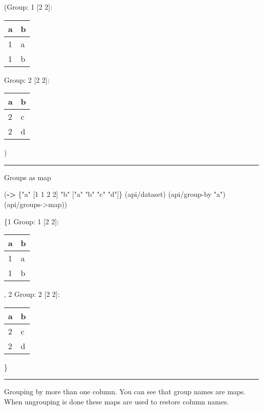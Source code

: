 \documentclass[]{article}
\newenvironment{Shaded}{\begin{snugshade}}{\end{snugshade}}
\newcommand{\KeywordTok}[1]{\textcolor[rgb]{0.13,0.29,0.53}{\textbf{#1}}}
\newcommand{\DecValTok}[1]{\textcolor[rgb]{0.00,0.00,0.81}{#1}}
\newcommand{\StringTok}[1]{\textcolor[rgb]{0.31,0.60,0.02}{#1}}
\newcommand{\NormalTok}[1]{#1}
\begin{document}
(Group: 1 {[}2 2{]}:

\begin{longtable}[]{@{}ll@{}}
\toprule
a & b\tabularnewline
\midrule
\endhead
1 & a\tabularnewline
1 & b\tabularnewline
\bottomrule
\end{longtable}

Group: 2 {[}2 2{]}:

\begin{longtable}[]{@{}ll@{}}
\toprule
a & b\tabularnewline
\midrule
\endhead
2 & c\tabularnewline
2 & d\tabularnewline
\bottomrule
\end{longtable}

)

\begin{center}\rule{0.5\linewidth}{0.5pt}\end{center}

Groups as map

\begin{Shaded}
\begin{Highlighting}[]
\NormalTok{(}\KeywordTok{->}\NormalTok{ \{}\StringTok{"a"}\NormalTok{ [}\DecValTok{1} \DecValTok{1} \DecValTok{2} \DecValTok{2}\NormalTok{]}
     \StringTok{"b"}\NormalTok{ [}\StringTok{"a"} \StringTok{"b"} \StringTok{"c"} \StringTok{"d"}\NormalTok{]\}}
\NormalTok{    (api/dataset)}
\NormalTok{    (api/group-by }\StringTok{"a"}\NormalTok{)}
\NormalTok{    (api/groups->map))}
\end{Highlighting}
\end{Shaded}

\{1 Group: 1 {[}2 2{]}:

\begin{longtable}[]{@{}ll@{}}
\toprule
a & b\tabularnewline
\midrule
\endhead
1 & a\tabularnewline
1 & b\tabularnewline
\bottomrule
\end{longtable}

, 2 Group: 2 {[}2 2{]}:

\begin{longtable}[]{@{}ll@{}}
\toprule
a & b\tabularnewline
\midrule
\endhead
2 & c\tabularnewline
2 & d\tabularnewline
\bottomrule
\end{longtable}

\}

\begin{center}\rule{0.5\linewidth}{0.5pt}\end{center}

Grouping by more than one column. You can see that group names are maps.
When ungrouping is done these maps are used to restore column names.
\end{document}
